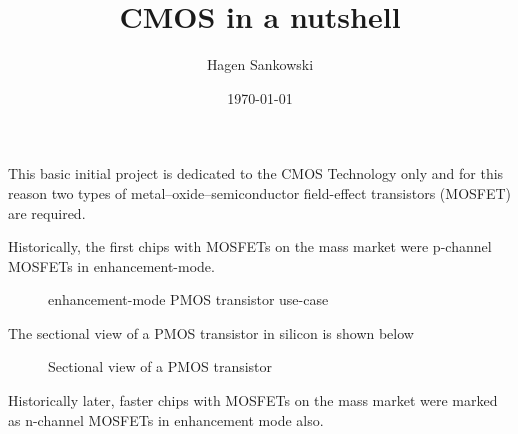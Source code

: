 \documentclass[10pt,a4paper,oneside]{article}
\title{CMOS in a nutshell}
\date{\today}
\author{	Hagen Sankowski}
\newcounter{ct}
\begin{document}
\begin{abstract}
	
\end{abstract}
\newpage

\maketitle

This basic initial project is dedicated to the CMOS Technology only and for this reason two types of metal–oxide–semiconductor field-effect transistors (MOSFET) are required.

Historically, the first chips with MOSFETs on the mass market were p-channel MOSFETs in enhancement-mode.

\begin{figure}[H]
	\centering
	\begin{circuitdiagram}{20}{20}
	\end{circuitdiagram}
	\caption{enhancement-mode PMOS transistor use-case}
\end{figure}

The sectional view of a PMOS transistor in silicon is shown below
\begin{figure}[H]
	\centering
	\begin{tikzpicture}[node distance = 3cm, auto, thick,scale=0.5, every node/.style={transform shape}]
		
	\end{tikzpicture}
	\caption{Sectional view of a PMOS transistor}
\end{figure}

Historically later, faster chips with MOSFETs on the mass market were marked as n-channel MOSFETs in enhancement mode also.
\end{document}
